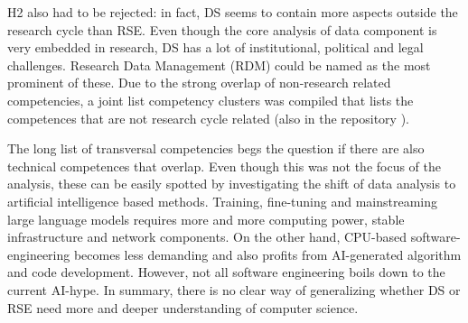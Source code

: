 \documentclass[
        english,biblatex
    ]{lni}
\begin{document}
    H2 also had to be rejected: in fact, DS seems to contain more
    aspects outside the research cycle than RSE. Even though the core
    analysis of data component is very embedded in research, DS has a
    lot of institutional, political and legal challenges. Research Data
    Management (RDM) could be named as the most prominent of these. Due
    to the strong overlap of non-research related competencies, a joint
    list competency clusters was compiled that lists the competences
    that are not research cycle related (also in the repository
    \autocite{ds2rse2025}).

    The long list of transversal competencies begs the question if there
    are also technical competences that overlap. Even though this was
    not the focus of the analysis, these can be easily spotted by
    investigating the shift of data analysis to artificial intelligence
    based methods. Training, fine-tuning and mainstreaming large
    language models requires more and more computing power, stable
    infrastructure and network components. On the other hand, CPU-based
    software-engineering becomes less demanding and also profits from
    AI-generated algorithm and code development. However, not all
    software engineering boils down to the current AI-hype. In summary,
    there is no clear way of generalizing whether DS or RSE need more
    and deeper understanding of computer science.

    \printbibliography

\end{document}
